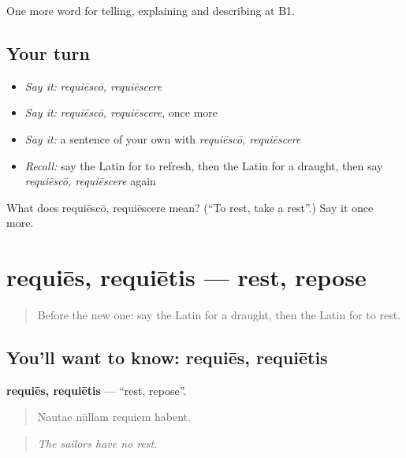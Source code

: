 \begin{grammarlens}[title={What you've built}]
One more word for telling, explaining and describing at B1.
\end{grammarlens}

\subsection*{Your turn}
\begin{itemize}
\raggedright
  \item \emph{Say it:} \emph{requiēscō, requiēscere}
  \item \emph{Say it:} \emph{requiēscō, requiēscere}, once more
  \item \emph{Say it:} a sentence of your own with \emph{requiēscō, requiēscere}
  \item \emph{Recall:} say the Latin for to refresh, then the Latin for a draught, then say \emph{requiēscō, requiēscere} again
\end{itemize}

\begin{tcolorbox}[breakable,colback=teal!4,colframe=teal!35!black,title={Before you move on}]
What does requiēscō, requiēscere mean? (\textquotedblleft{}To rest, take a rest\textquotedblright{}.) Say it once more.
\end{tcolorbox}
\section[requiēs, requiētis]{requiēs, requiētis — rest, repose}

\label{lesson:LA-C527-requies}



\begin{quote}
Before the new one: say the Latin for a draught, then the Latin for to rest.
\end{quote}

\subsection*{You'll want to know: requiēs, requiētis}
\textbf{requiēs, requiētis} — \textquotedblleft{}rest, repose\textquotedblright{}.

\begin{quote}
Nautae nūllam requiem habent.
\end{quote}

\begin{quote}
\emph{The sailors have no rest.}
\end{quote}

